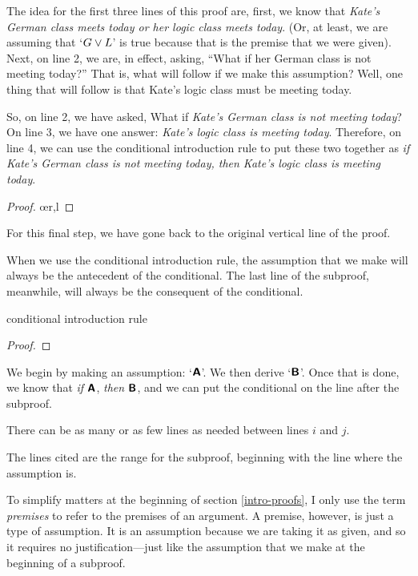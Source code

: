 The idea for the first three lines of this proof are, first, we know that \textit{Kate's German class meets today or her logic class meets today}. (Or, at least, we are assuming that `$ G \vee L$' is true because that is the premise that we were given). Next, on line 2, we are, in effect, asking, ``What if her German class is not meeting today?'' That is, what will follow if we make this assumption? Well, one thing that will follow is that Kate's logic class must be meeting today.  

So, on line 2, we have asked, What if \textit{Kate's German class is not meeting today}? On line 3, we have one answer: \textit{Kate's logic class is meeting today}. Therefore, on line 4, we can use the conditional introduction rule to put these two together as \textit{if Kate's German class is not meeting today, then Kate's logic class is meeting today}.
	\begin{proof}
		 \pr{}
		\open
			 \as{}
			\oe{r,l}
			\close
	\end{proof}
For this final step, we have gone back to the original vertical line of the proof. 

When we use the conditional introduction rule, the assumption that we make will always be the antecedent of the conditional. The last line of the subproof, meanwhile, will always be the consequent of the conditional.

\begin{factboxy}{conditional introduction rule}
	\begin{proof}
		\open
			 \as{}
		\close
	\end{proof}

\small{We begin by making an assumption: `$\bm{\mathsf{A}}$'. We then derive `$\bm{\mathsf{B}}$'. Once that is done, we know that \textit{if} $\bm{\mathsf{A}}$, \textit{then} $\bm{\mathsf{B}}$, and we can put the conditional on the line after the subproof.

There can be as many or as few lines as needed between lines $i$ and $j$.

The lines cited are the range for the subproof, beginning with the line where the assumption is.} 
\end{factboxy}


\begin{notebox}
To simplify matters at the beginning of section \ref{intro-proofs}, I only use the term \textit{premises} to refer to the premises of an argument. A premise, however, is just a type of assumption. It is an assumption because we are taking it as given, and so it requires no justification---just like the assumption that we make at the beginning of a subproof. 
\end{notebox}


